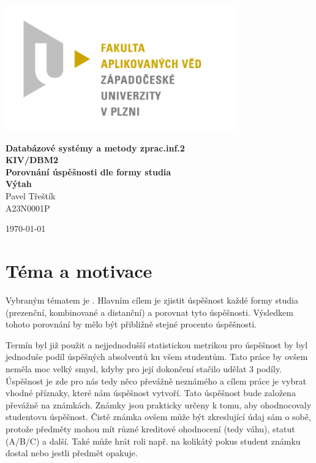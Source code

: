 \documentclass[12pt, letterpaper]{article}
\begin{document}
\begin{titlepage}
\centerline{\includegraphics[width=10cm]{img/logo}}
\begin{center}
\vspace{30px}
{\huge
\textbf{Databázové systémy a metody zprac.inf.2}\\
\vspace{1cm}
}
{\Large
\textbf{KIV/DBM2}\\
\vspace{1cm}
}
{\large
\textbf{Porovnání úspěšnosti dle formy studia}\\
\textbf{Výtah}\\
\vspace{1cm}
}
\vspace{1cm}
{\large
Pavel Třeštík\\
}
{\normalsize
A23N0001P
}
\end{center}
\vspace{\fill}
\hfill
\begin{minipage}[t]{7cm}
\flushright
\today
\end{minipage}
\end{titlepage}
\section{Téma a motivace}
Vybraným tématem je . Hlavním cílem je zjistit úspěšnost každé formy studia
(prezenční, kombinované a distanční) a porovnat tyto úspěšnosti. Výsledkem tohoto porovnání by mělo být přibližně
stejné procento úspěšnosti.

Termín  byl již použit a nejjednodušší statistickou metrikou pro úspěšnost by byl jednoduše podíl
úspěšných absolventů ku všem studentům. Tato práce by ovšem neměla moc velký smysl, kdyby pro její dokončení stačilo 
udělat 3 podíly. Úspěšnost je zde pro nás tedy něco převážně neznámého a cílem práce je vybrat vhodné příznaky, které
nám úspěšnost vytvoří. Tato úspěšnost bude založena převážně na známkách. Známky jsou prakticky určeny k tomu, aby
ohodnocovaly studentovu úspěšnost. Čistě známka ovšem může být zkreslující údaj sám o sobě, protože předměty mohou
mít různé kreditové ohodnocení (tedy váhu), statut (A/B/C) a další. Také může hrát roli např. na kolikátý pokus
student známku dostal nebo jestli předmět opakuje.
\end{document}
